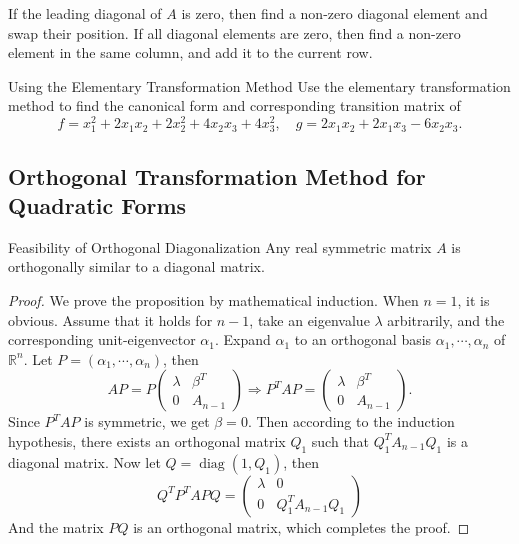 \begin{note}
  If the leading diagonal of $A$ is zero, then find a non-zero diagonal element
  and swap their position.
  If all diagonal elements are zero, then find a non-zero element in the same
  column, and add it to the current row.
\end{note}

\begin{example}{Using the Elementary Transformation Method}{}
  Use the elementary transformation method to find the canonical form
  and corresponding transition matrix of
  \begin{equation}
    f = x_1^2 + 2x_1x_2 + 2x_2^2 + 4x_2x_3 + 4x_3^2, \quad
    g = 2x_1x_2 + 2x_1x_3 - 6x_2x_3.
  \end{equation}
\end{example}

\begin{solution}
  
\end{solution}

\subsection{Orthogonal Transformation Method for Quadratic Forms}

\begin{proposition}{Feasibility of Orthogonal Diagonalization}{}
  Any real symmetric matrix $A$ is orthogonally similar to a diagonal matrix.
\end{proposition}

\begin{proof}
  We prove the proposition by mathematical induction.
  When $n = 1$, it is obvious.
  Assume that it holds for $n - 1$, take an eigenvalue $\lambda$ arbitrarily,
  and the corresponding unit-eigenvector $\alpha_1$.
  Expand $\alpha_1$ to an orthogonal basis $\alpha_1,\cdots,\alpha_n$ of
  $\mathbb{R}^n$.
  Let $P = (\alpha_1,\cdots,\alpha_n)$, then
  \begin{equation}
    AP = P \begin{pmatrix}
        \lambda&\beta^T\\
        0&A_{n-1}
      \end{pmatrix}
    \Rightarrow
    P^TAP=
    \begin{pmatrix}
      \lambda&\beta^T\\
      0&A_{n-1}
    \end{pmatrix}.
  \end{equation}
  Since $P^TAP$ is symmetric, we get $\beta = 0$.
  Then according to the induction hypothesis, there exists an orthogonal matrix $Q_1$
  such that $Q_1^T A_{n-1}Q_1$ is a diagonal matrix.
  Now let $Q = \operatorname{diag}(1, Q_1)$, then
  \begin{equation}
    Q^TP^TAPQ =
    \begin{pmatrix}
      \lambda & 0\\
      0 & Q_1^TA_{n-1}Q_1
    \end{pmatrix}
  \end{equation}
  And the matrix $PQ$ is an orthogonal matrix, which completes the proof.
\end{proof}

